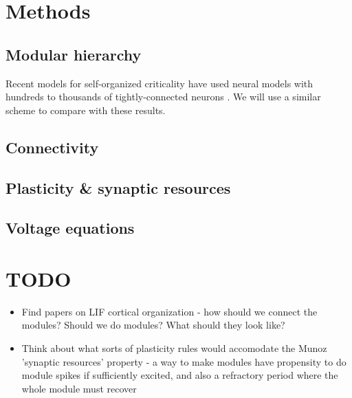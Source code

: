 \documentclass[a4paper, 12pt]{article}
\begin{document}
\section*{Methods}

\subsection*{Modular hierarchy}
Recent models for self-organized criticality have used neural models with hundreds to thousands of tightly-connected neurons \cite{munozlg, rubinov}. We will use a similar scheme to compare with these results.\\

\subsection*{Connectivity}
\subsection*{Plasticity \& synaptic resources}
\subsection*{Voltage equations}

\section*{TODO}
\begin{itemize}
\item Find papers on LIF cortical organization - how should we connect the modules? Should we do modules? What should they look like?
\item Think about what sorts of plasticity rules would accomodate the Munoz 'synaptic resources' property - a way to make modules have propensity to do module spikes if sufficiently excited, and also a refractory period where the whole module must recover
\end{itemize}



\end{document}

